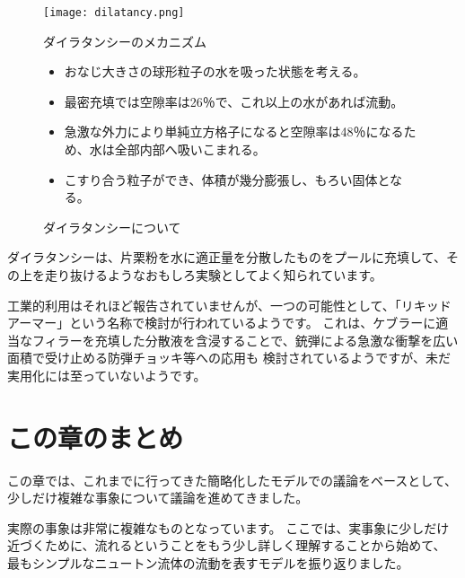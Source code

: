 \documentclass[uplatex,dvipdfmx,a4paper,11pt]{jsarticle}
\begin{document}
\begin{figure}[htb]
	\begin{center}
		\begin{minipage}{0.9\textwidth}
			\begin{center}
			\texttt{[image: dilatancy.png]}
			\end{center}
		\end{minipage}
		\begin{minipage}{0.9\textwidth}
			\begin{itembox}[l]{ダイラタンシーのメカニズム}
				\begin{itemize}
					\item おなじ大きさの球形粒子の水を吸った状態を考える。
					\item 最密充填では空隙率は26％で、これ以上の水があれば流動。
					\item 急激な外力により単純立方格子になると空隙率は48％になるため、水は全部内部へ吸いこまれる。
					\item こすり合う粒子ができ、体積が幾分膨張し、もろい固体となる。
				\end{itemize}
			\end{itembox}
		\end{minipage}
		\caption{ダイラタンシーについて}
		\label{fig:dilatant}
	\end{center}
\end{figure}

ダイラタンシーは、片栗粉を水に適正量を分散したものをプールに充填して、その上を走り抜けるようなおもしろ実験としてよく知られています。

工業的利用はそれほど報告されていませんが、一つの可能性として、「リキッドアーマー」という名称で検討が行われているようです。
これは、ケブラーに適当なフィラーを充填した分散液を含浸することで、銃弾による急激な衝撃を広い面積で受け止める防弾チョッキ等への応用も
検討されているようですが、未だ実用化には至っていないようです。


\section*{この章のまとめ}

この章では、これまでに行ってきた簡略化したモデルでの議論をベースとして、少しだけ複雑な事象について議論を進めてきました。

実際の事象は非常に複雑なものとなっています。
ここでは、実事象に少しだけ近づくために、流れるということをもう少し詳しく理解することから始めて、
最もシンプルなニュートン流体の流動を表すモデルを振り返りました。
\end{document}
